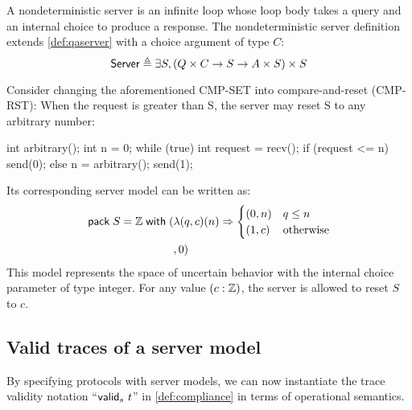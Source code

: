 \begin{definition}
  \label{def:server}
  A nondeterministic server is an infinite loop whose loop body takes a query
  and an internal choice to produce a response.  The nondeterministic server
  definition extends \autoref{def:qaserver} with a choice argument of type $C$:
  \[\mathsf{Server}\triangleq\exists S,(Q\times C\to S\to A\times S)\times S\]
\end{definition}

Consider changing the aforementioned CMP-SET into compare-and-reset (CMP-RST):
When the request is greater than \inlinec S, the server may reset \inlinec S to
any arbitrary number:

\begin{cpp}
  int arbitrary();
  int n = 0;
  while (true) {
    int request = recv();
    if (request <= n) send(0);
    else { n = arbitrary(); send(1); }
  }
\end{cpp}

Its corresponding server model can be written as:
\begin{align*}
  \mathsf{pack}\;S=\mathbb Z\;\mathsf{with}\;(&\lambda(q,c)(n)\Rightarrow
      \begin{cases}
        (0,n)& q\le n\\
        (1,c)&\mathrm{otherwise}
      \end{cases}
   \\
    &,0)
\end{align*}
This model represents the space of uncertain behavior with the internal choice
parameter of type integer.  For any value $(c:\mathbb Z)$, the server is allowed to
reset $S$ to $c$.

\subsection{Valid traces of a server model}
By specifying protocols with server models, we can now instantiate the trace
validity notation ``$\mathsf{valid}_{s}~{t}$'' in \autoref{def:compliance} in terms of
operational semantics.

